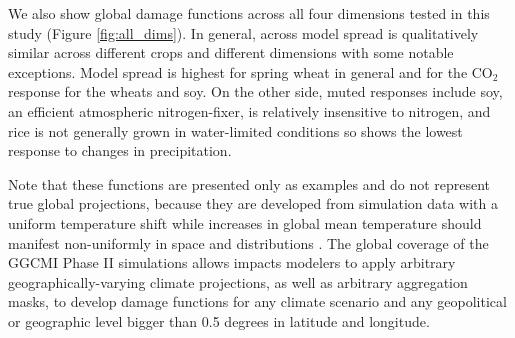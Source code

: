 \documentclass[gmd, manuscript]{copernicus} %
\begin{document}
We also show global damage functions across all four dimensions tested in this study (Figure \ref{fig:all_dims}). In general, across model spread is qualitatively similar across different crops and different dimensions with some notable exceptions. 
Model spread is highest for spring wheat in general and for the CO$_2$ response for the wheats and soy.
On the other side, muted responses include soy, an efficient atmospheric nitrogen-fixer, is relatively insensitive to nitrogen, and rice is not generally grown in water-limited conditions so shows the lowest response to changes in precipitation. 

Note that these functions are presented only as examples and do not represent true global projections, because they are developed from simulation data with a uniform temperature shift while increases in global mean temperature should manifest non-uniformly in space and distributions \citep{Sippel2015}. 
The global coverage of the GGCMI Phase II simulations allows impacts modelers to apply arbitrary geographically-varying climate projections, as well as arbitrary aggregation masks, to develop damage functions for any climate scenario and any geopolitical or geographic level bigger than 0.5 degrees in latitude and longitude.
\end{document}
